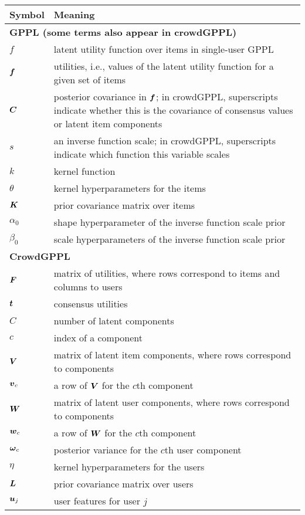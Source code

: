 \begin{table}
 \begin{tabularx}{\columnwidth}{p{1.7cm} X }
 \toprule 
 Symbol & Meaning \\
 \midrule 
\multicolumn{2}{l}{\textbf{GPPL (some terms also appear in crowdGPPL)}} \\
 $f$ & latent utility function over items in single-user GPPL \\
 $\boldsymbol f$ & utilities, i.e., values of the latent utility function for a given set of items \\
 $\boldsymbol C$ & posterior covariance in $\boldsymbol f$; in crowdGPPL, superscripts indicate 
 whether this is the covariance of consensus values or latent item components \\
 $s$ & an inverse function scale; in crowdGPPL, superscripts indicate which function this variable scales \\
 $k$ & kernel function \\
 $\theta$ & kernel hyperparameters for the items \\
 $\boldsymbol K$ & prior covariance matrix over items \\
 $\alpha_0$ & shape hyperparameter of the inverse function scale prior \\
 $\beta_0$ & scale hyperparameters of the inverse function scale prior \\
 \multicolumn{2}{l}{\textbf{CrowdGPPL}} \\
 $\boldsymbol F$ & matrix of utilities, where rows correspond to items and columns to users \\
 $\boldsymbol t$ & consensus utilities \\
 $C$ & number of latent components \\
 $c$ & index of a component \\
 $\boldsymbol V$ & matrix of latent item components, where rows correspond to components \\
 $\boldsymbol v_c$ & a row of $\boldsymbol V$ for the $c$th component \\
 $\boldsymbol W$ & matrix of latent user components, where rows correspond to components \\
 $\boldsymbol w_c$ & a row of $\boldsymbol W$ for the $c$th component \\ 
 $\boldsymbol \omega_c$ & posterior variance for the $c$th user component \\
 $\eta$ & kernel hyperparameters for the users \\
 $\boldsymbol L$ & prior covariance matrix over users \\
 $\boldsymbol u_j$ & user features for user $j$ \\

\end{tabularx}
\end{table}
